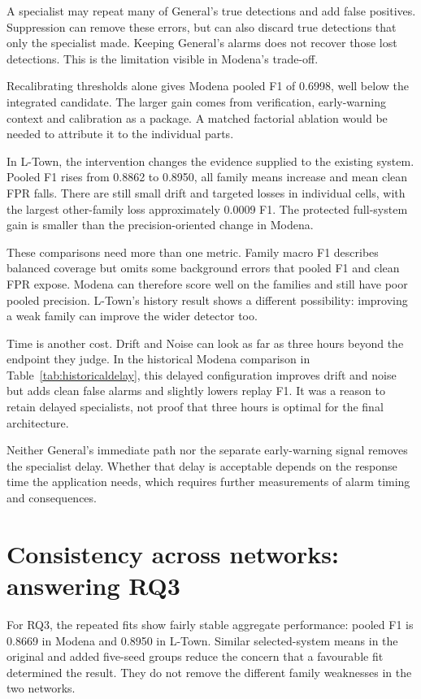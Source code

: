 A specialist may repeat many of General's true detections and add false positives. Suppression can remove these errors, but can also discard true detections that only the specialist made. Keeping General's alarms does not recover those lost detections. This is the limitation visible in Modena's trade-off.

Recalibrating thresholds alone gives Modena pooled F1 of 0.6998, well below the integrated candidate. The larger gain comes from verification, early-warning context and calibration as a package. A matched factorial ablation would be needed to attribute it to the individual parts.

In L-Town, the intervention changes the evidence supplied to the existing system. Pooled F1 rises from 0.8862 to 0.8950, all family means increase and mean clean FPR falls. There are still small drift and targeted losses in individual cells, with the largest other-family loss approximately 0.0009 F1. The protected full-system gain is smaller than the precision-oriented change in Modena.

These comparisons need more than one metric. Family macro F1 describes balanced coverage but omits some background errors that pooled F1 and clean FPR expose. Modena can therefore score well on the families and still have poor pooled precision. L-Town's history result shows a different possibility: improving a weak family can improve the wider detector too.

Time is another cost. Drift and Noise can look as far as three hours beyond the endpoint they judge. In the historical Modena comparison in Table~\ref{tab:historicaldelay}, this delayed configuration improves drift and noise but adds clean false alarms and slightly lowers replay F1. It was a reason to retain delayed specialists, not proof that three hours is optimal for the final architecture.

Neither General's immediate path nor the separate early-warning signal removes the specialist delay. Whether that delay is acceptable depends on the response time the application needs, which requires further measurements of alarm timing and consequences.

\section{Consistency across networks: answering RQ3}
For RQ3, the repeated fits show fairly stable aggregate performance: pooled F1 is 0.8669 in Modena and 0.8950 in L-Town. Similar selected-system means in the original and added five-seed groups reduce the concern that a favourable fit determined the result. They do not remove the different family weaknesses in the two networks.

